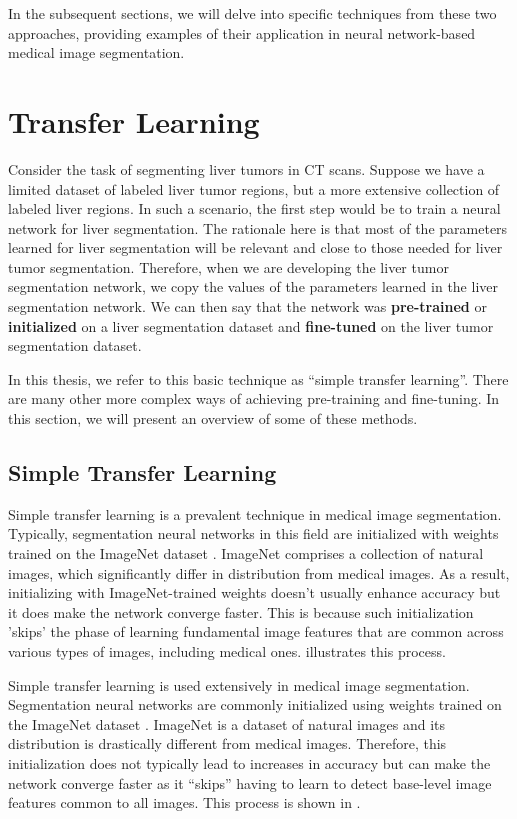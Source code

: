 In the subsequent sections, we will delve into specific techniques from these two approaches, providing examples of their application in neural network-based medical image segmentation.

\section{Transfer Learning}

Consider the task of segmenting liver tumors in CT scans. Suppose we have a limited dataset of labeled liver tumor regions, but a more extensive collection of labeled liver regions. In such a scenario, the first step would be to train a neural network for liver segmentation. The rationale here is that most of the parameters learned for liver segmentation will be relevant and close to those needed for liver tumor segmentation. Therefore, when we are developing the liver tumor segmentation network, we copy the values of the parameters learned in the liver segmentation network. We can then say that the network was \textbf{pre-trained} or \textbf{initialized} on a liver segmentation dataset and \textbf{fine-tuned} on the liver tumor segmentation dataset.

In this thesis, we refer to this basic technique as ``simple transfer learning''. There are many other more complex ways of achieving pre-training and fine-tuning. In this section, we will present an overview of some of these methods.

	\subsection{Simple Transfer Learning}
	
	Simple transfer learning is a prevalent technique in medical image segmentation. Typically, segmentation neural networks in this field are initialized with weights trained on the ImageNet dataset \cite{dengImageNetLargescaleHierarchical2009a}. ImageNet comprises a collection of natural images, which significantly differ in distribution from medical images. As a result, initializing with ImageNet-trained weights doesn't usually enhance accuracy but it does make the network converge faster. This is because such initialization 'skips' the phase of learning fundamental image features that are common across various types of images, including medical ones.  illustrates this process.
	
Simple transfer learning is used extensively in medical image segmentation. Segmentation neural networks are commonly initialized using weights trained on the ImageNet dataset \cite{dengImageNetLargescaleHierarchical2009a}. ImageNet is a dataset of natural images and its distribution is drastically different from medical images. Therefore, this initialization does not typically lead to increases in accuracy but can make the network converge faster as it ``skips'' having to learn to detect base-level image features common to all images. This process is shown in .

